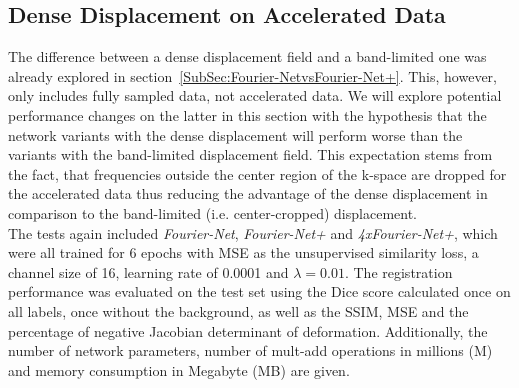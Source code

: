 \documentclass[english,version-2022-01]{uzl-thesis} %
\begin{document}
\subsection{Dense Displacement on Accelerated Data} \label{SubSec:DenseDisplacementAcc}
The difference between a dense displacement field and a band-limited one was already explored in section~\ref{SubSec:Fourier-NetvsFourier-Net+}. This, however, only includes fully sampled data, not accelerated data. We will explore potential performance changes on the latter in this section with the hypothesis that the network variants with the dense displacement will perform worse than the variants with the band-limited displacement field. This expectation stems from the fact, that frequencies outside the center region of the k-space are dropped for the accelerated data thus reducing the advantage of the dense displacement in comparison to the band-limited (i.e. center-cropped) displacement. \\
The tests again included \emph{Fourier-Net}, \emph{Fourier-Net+} and \emph{4xFourier-Net+}, which were all trained for 6 epochs with MSE as the unsupervised similarity loss, a channel size of 16, learning rate of 0.0001 and $\lambda=0.01$. The registration performance was evaluated on the test set using the Dice score calculated once on all labels, once without the background, as well as the SSIM, MSE and the percentage of negative Jacobian determinant of deformation. Additionally, the number of network parameters, number of mult-add operations in millions (M) and memory consumption in Megabyte (MB) are given.
\end{document}
